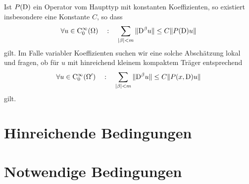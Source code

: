 Ist $P(\mathrm D)$ ein Operator vom Haupttyp mit konstanten Koeffizienten, so existiert insbesondere eine Konstante $C$, so dass
\begin{equation}
  \forall u\in\mathrm C_0^\infty(\Omega)\quad:\quad  \sum_{|\beta|<m} \| \mathrm D^\beta u\| \le C \| P(\mathrm D) u \|
\end{equation}
gilt. Im Falle variabler Koeffizienten suchen wir eine solche Abschätzung lokal und fragen, ob für $u$ mit hinreichend kleinem kompaktem Träger entsprechend
\begin{equation}
\forall u\in\mathrm C_0^\infty(\Omega')\quad:\quad      \sum_{|\beta|<m} \| \mathrm D^\beta u\| \le C \| P(x,\mathrm D) u \|
\end{equation}
gilt.

\section{Hinreichende Bedingungen}
\cite{Hormander:1955}


\section{Notwendige Bedingungen}
\cite{Hormander:1960a}
%
%
%
%
